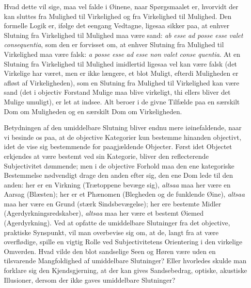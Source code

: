 \documentclass[12pt]{book}
\newcommand{\opage}[1]{\marginnote{\footnotesize\textit{[#1]}}}
\begin{document}
Hvad dette vil sige, maa vel falde i Øinene, naar Spørgsmaalet er, hvorvidt der kan sluttes fra Mulighed til Virkelighed og fra Virkelighed til Mulighed. Den formelle Logik er, ifølge det eengang Vedtagne, ligesaa sikker paa, at enhver Slutning fra Virkelighed til Mulighed maa være sand: \textit{ab esse ad posse esse valet consequentia}, som den er forvisset om, at enhver Slutning fra Mulighed til Virkelighed maa være falsk: \textit{a posse esse ad esse non valet conse%
\opage{305}quentia}. At en Slutning fra Virkelighed til Mulighed imidlertid ligesaa vel kan være falsk (det Virkelige har været, men er ikke længere, et blot Muligt, efterdi Muligheden er afløst af Virkeligheden), som en Slutning fra Mulighed til Virkelighed kan være sand (det i objectiv Forstand Mulige maa blive virkeligt, thi ellers bliver det Mulige umuligt), er let at indsee. Alt beroer i de givne Tilfælde paa en særskilt Dom om Muligheden og en særskilt Dom om Virkeligheden.

Betydningen af den umiddelbare Slutning bliver endnu mere iøinefaldende, naar vi besinde os paa, at de objective Kategorier kun bestemme hinanden objectivt, idet de vise sig bestemmende for paagjældende Objecter. Først idet Objectet erkjendes at være bestemt ved sin Kategorie, bliver den reflecterende Subjectivitet dømmende; men i de objective Forhold maa den ene kategoriske Bestemmelse nødvendigt drage den anden efter sig, den ene Dom lede til den anden: her er en Virkning (Trætoppene bevæge sig), \emph{altsaa} maa her være en Aarsag (Blæsten); her er et Phænomen (Blegheden og de funklende Øine), \emph{altsaa} maa her være en Grund (stærk Sindsbevægelse); her ere bestemte Midler (Agerdyrkningsredskaber), \emph{altsaa} maa her være et bestemt Øiemed (Agerdyrkning). Ved at opfatte de umiddelbare Slutninger fra det objective, praktiske Synspunkt, vil man overbevise sig om, at de, langt fra at være overflødige, spille en vigtig Rolle ved Subjectivitetens Orientering i den virkelige Omverden. Hvad vilde den blot sandselige Seen og Høren være uden en tilsvarende Mangfoldighed af umiddelbare Slutninger? Eller hvorledes skulde man forklare sig den Kjendsgjerning, at der kan gives Sandsebedrag, optiske, akustiske Illusioner, dersom der ikke gaves umiddelbare Slutninger?
\end{document}
